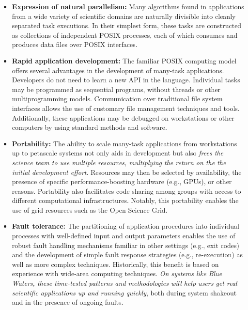 \documentclass[10pt,letterpaper]{article}
\begin{document}
\begin{itemize}
  \item {\bf Expression of natural parallelism:} Many algorithms found
    in applications from a wide variety of scientific domains are
    naturally divisible into cleanly separated task executions.  In
    their simplest form, these tasks are constructed as collections of
    independent POSIX processes, each of which consumes and produces
    data files over POSIX interfaces.
  \item {\bf Rapid application development:} The familiar POSIX
    computing model offers several advantages in the development of
    many-task applications.  Developers do not need to learn a new API in
    the language.  Individual tasks may be programmed as sequential
    programs, without threads or other multiprogramming models.
    Communication over traditional file system interfaces allows the
    use of customary file management techniques and tools.
    Additionally, these applications may be debugged on workstations
    or other computers by using standard methods and software.
  \item {\bf Portability:} The ability to scale many-task applications
    from workstations up to petascale systems not only aids in
    development but also \emph{frees the science team to use multiple
    resources, multiplying the return on the the initial development
    effort}.  Resources may then be selected by availability, the
    presence of specific performance-boosting hardware (e.g., GPUs),
    or other reasons.  Portability also facilitates code sharing among groups
    with access to different computational infrastructures.  Notably,
    this portability enables the use of grid resources such as the
    Open Science Grid.
  \item {\bf Fault tolerance:} The partitioning of application
    procedures into individual processes with well-defined input and
    output parameters enables the use of robust fault handling
    mechanisms familiar in other settings (e.g., exit codes) and the
    development of simple fault response strategies (e.g., re-execution)
    as well as more complex techniques.  Historically, this benefit
    is based on experience with wide-area computing techniques.
    \emph{On systems like Blue Waters, these time-tested patterns and
    methodologies will help users get real scientific applications
    up and running quickly}, both during system shakeout and in the
    presence of ongoing faults.
\end{itemize}
\end{document}
